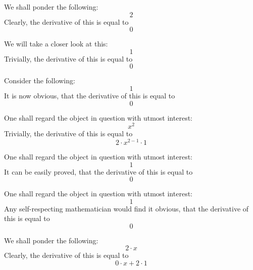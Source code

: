 \documentclass{article}
\begin{document}
We shall ponder the following:
\begin{equation}
2 
\end{equation}
Clearly, the derivative of this is equal to
\begin{equation}
0 
\end{equation}

We will take a closer look at this:
\begin{equation}
1 
\end{equation}
Trivially, the derivative of this is equal to
\begin{equation}
0 
\end{equation}

Consider the following:
\begin{equation}
1 
\end{equation}
It is now obvious, that the derivative of this is equal to
\begin{equation}
0 
\end{equation}

One shall regard the object in question with utmost interest:
\begin{equation}
x ^{2 } 
\end{equation}
Trivially, the derivative of this is equal to
\begin{equation}
2 \cdot x ^{2 - 1 } \cdot 1 
\end{equation}

One shall regard the object in question with utmost interest:
\begin{equation}
1 
\end{equation}
It can be easily proved, that the derivative of this is equal to
\begin{equation}
0 
\end{equation}

One shall regard the object in question with utmost interest:
\begin{equation}
1 
\end{equation}
Any self-respecting mathematician would find it obvious, that the derivative of this is equal to
\begin{equation}
0 
\end{equation}

We shall ponder the following:
\begin{equation}
2 \cdot x 
\end{equation}
Clearly, the derivative of this is equal to
\begin{equation}
0 \cdot x + 2 \cdot 1 
\end{equation}
\end{document}
